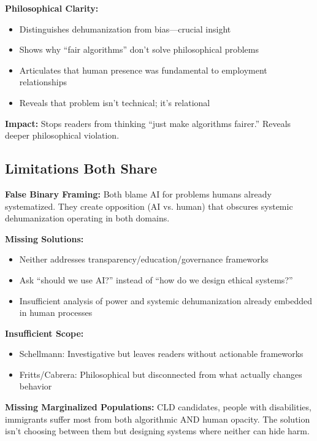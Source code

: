 \documentclass[12pt,letterpaper]{article}
\begin{document}
\begin{keyfindings}
\textbf{Philosophical Clarity:}
\begin{itemize}[leftmargin=*,noitemsep,font=\small]
    \item Distinguishes dehumanization from bias---crucial insight
    \item Shows why ``fair algorithms'' don't solve philosophical problems
    \item Articulates that human presence was fundamental to employment relationships
    \item Reveals that problem isn't technical; it's relational
\end{itemize}

\textbf{Impact:} Stops readers from thinking ``just make algorithms fairer.'' Reveals deeper philosophical violation.
\end{keyfindings}

\subsection{Limitations Both Share}

\begin{keyfindings}
\textbf{False Binary Framing:}
Both blame AI for problems humans already systematized. They create opposition (AI vs. human) that obscures systemic dehumanization operating in both domains.

\textbf{Missing Solutions:}
\begin{itemize}[leftmargin=*,noitemsep,font=\small]
    \item Neither addresses transparency/education/governance frameworks
    \item Ask ``should we use AI?'' instead of ``how do we design ethical systems?''
    \item Insufficient analysis of power and systemic dehumanization already embedded in human processes
\end{itemize}

\textbf{Insufficient Scope:}
\begin{itemize}[leftmargin=*,noitemsep,font=\small]
    \item Schellmann: Investigative but leaves readers without actionable frameworks
    \item Fritts/Cabrera: Philosophical but disconnected from what actually changes behavior
\end{itemize}

\textbf{Missing Marginalized Populations:}
CLD candidates, people with disabilities, immigrants suffer most from both algorithmic AND human opacity. The solution isn't choosing between them but designing systems where neither can hide harm.
\end{keyfindings}
\end{document}
